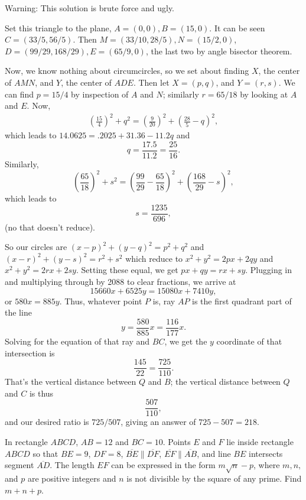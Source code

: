 \documentclass[11pt]{article}
\theoremstyle{definition}
\begin{document}
\begin{solution}[name={Solution by RminusQ}]
	Warning: This solution is brute force and ugly.
	
	Set this triangle to the plane, $ A = (0,0), B = (15,0)$. It can be seen $ C = ({33}/5, {56}/5)$. Then $ M = ({33}/{10}, {28}/5), N = ({15}/2,0)$, $ D = ({99}/{29}, {168}/{29}), E = ({65}/9, 0)$, the last two by angle bisector theorem.
	
	Now, we know nothing about circumcircles, so we set about finding $X$, the center of $AMN$, and $Y$, the center of $ADE$. Then let $ X = (p,q)$, and $Y = (r,s)$. We can find $ p = {15}/4$ by inspection of $A$ and $N$; similarly $ r ={65}/{18}$ by looking at $A$ and $E$. Now,
	\begin{align*}
		\left(\frac{15}4\right)^2 + q^2 = \left(\frac9{20}\right)^2 + \left(\frac{28}5-q\right)^2,
	\end{align*}
	which leads to $ 14.0625 = .2025 + 31.36 - 11.2q$ and $$ q = \frac{17.5}{11.2} = \frac{25}{16}.$$
	Similarly, $$ \left(\frac{65}{18}\right)^2 + s^2 = \left(\frac{99}{29} - \frac{65}{18}\right)^2 + \left(\frac{168}{29} - s\right)^2,$$ which leads to $$ s = \frac{1235}{696},$$ (no that doesn't reduce).
	
	So our circles are $ (x-p)^2 + (y-q)^2 = p^2 + q^2$ and $ (x-r)^2 + (y-s)^2 = r^2 + s^2$ which reduce to $ x^2 + y^2 = 2px + 2qy$ and $ x^2 + y^2 = 2rx + 2sy$. Setting these equal, we get $ px+qy = rx+sy$. Plugging in and multiplying through by 2088 to clear fractions, we arrive at $$ 15660x+6525y = 15080x+7410y,$$ or $ 580x = 885y$. Thus, whatever point $P$ is, ray $AP$ is the first quadrant part of the line $$ y = \frac{580}{885}x = \frac{116}{177}x.$$
	Solving for the equation of that ray and $BC$, we get the $y$ coordinate of that intersection is $$\frac{145}{22} = \frac{725}{110}.$$ That's the vertical distance between $Q$ and $B$; the vertical distance between $Q$ and $C$ is thus $$ \frac{507}{110},$$ and our desired ratio is ${725}/{507}$, giving an answer of $ 725 - 507 = \boxed{218}$.
\end{solution}













\begin{question}[name={2011 AIME I, \href{https://artofproblemsolving.com/community/c4p2209660}{Problem 2}}]
	In rectangle $ABCD$, $AB=12$ and $BC=10$. Points $E$ and $F$ lie inside rectangle $ABCD$ so that $BE=9$, $DF=8$, $\overline{BE} \parallel \overline{DF}$, $\overline{EF} \parallel \overline{AB}$, and line $BE$ intersects segment $\overline{AD}$. The length $EF$ can be expressed in the form $m\sqrt{n}-p$, where $m,n,$ and $p$ are positive integers and $n$ is not divisible by the square of any prime. Find $m+n+p$.
\end{question}
\end{document}
